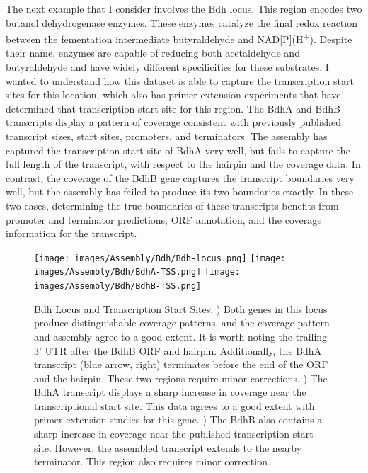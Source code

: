 The next example that I consider involves the Bdh locus. This region encodes two butanol dehydrogenase enzymes. These enzymes catalyze the final redox reaction between the fementation intermediate butyraldehyde and NAD[P](H\textsuperscript{+}). Despite their name, enzymes are capable of reducing both acetaldehyde and butyraldehyde and have widely different specificities for these substrates. I wanted to understand how this dataset is able to capture the transcription start sites for this location, which also has primer extension experiments that have determined that transcription start site for this region.
The BdhA and BdhB transcripts display a pattern of coverage consistent with previously published transcript sizes, start sites, promoters, and terminators. The assembly has captured the transcription start site of BdhA very well, but fails to capture the full length of the transcript, with respect to the hairpin and the coverage data. In contrast, the coverage of the BdhB gene captures the transcript boundaries very well, but the assembly has failed to produce its two boundaries exactly. In these two cases, determining the true boundaries of these transcripts benefits from promoter and terminator predictions, ORF annotation, and the coverage information for the transcript. 
\begin{figure}
{\texttt{[image: images/Assembly/Bdh/Bdh-locus.png]}
\label{fig:4a}}
{\texttt{[image: images/Assembly/Bdh/BdhA-TSS.png]}
\label{fig:4b}}
{\texttt{[image: images/Assembly/Bdh/BdhB-TSS.png]}
\label{fig:4c}}
\caption{Bdh Locus and Transcription Start Sites: ) Both genes in this locus produce distinguishable coverage patterns, and the coverage pattern and assembly agree to a good extent. It is worth noting the trailing 3' UTR after the BdhB ORF and hairpin. Additionally, the BdhA transcript (blue arrow, right) terminates before the end of the ORF and the hairpin. These two regions require minor corrections. ) The BdhA transcript displays a sharp increase in coverage near the transcriptional start site. This data agrees to a good extent with primer extension studies for this gene. ) The BdhB also contains a sharp increase in coverage near the published transcription start site. However, the assembled transcript extends to the nearby terminator. This region also requires minor correction.}
\end{figure}

